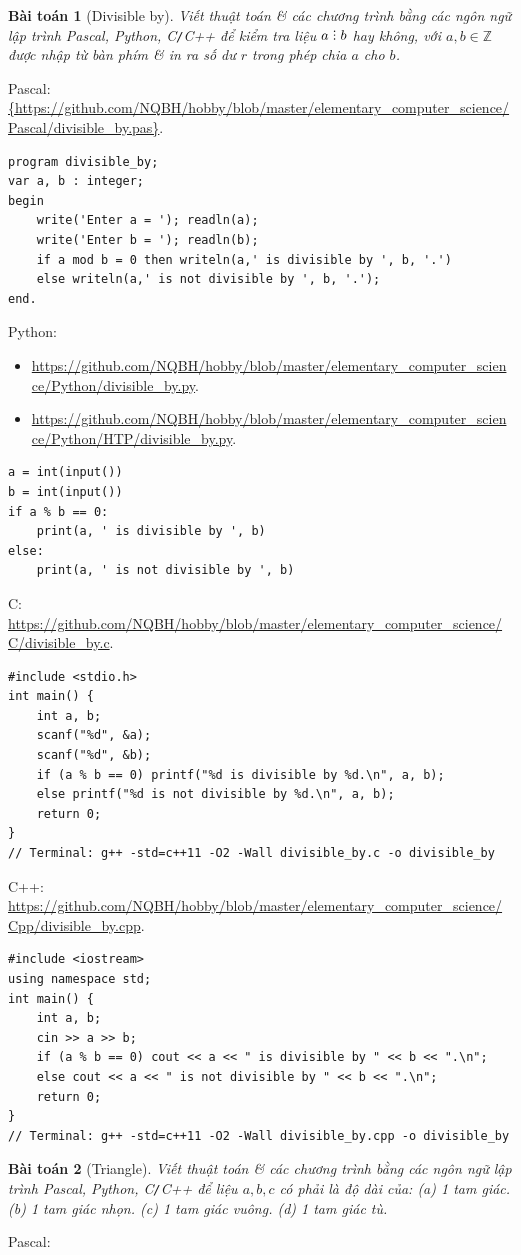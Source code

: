 \documentclass{article}
\newtheorem{baitoan}{Bài toán}
\DeclareRobustCommand{\divby}{%
	\mathrel{\vbox{\baselineskip.65ex\lineskiplimit0pt\hbox{.}\hbox{.}\hbox{.}}}%
}
\begin{document}
\begin{baitoan}[Divisible by]
	Viết thuật toán \& các chương trình bằng các ngôn ngữ lập trình {\sf Pascal, Python, C\texttt{/}C++} để kiểm tra liệu $a\divby b$ hay không, với $a,b\in\mathbb{Z}$ được nhập từ bàn phím \& in ra số dư $r$ trong phép chia $a$ cho $b$.
\end{baitoan}
\noindent Pascal: \url{{https://github.com/NQBH/hobby/blob/master/elementary_computer_science/Pascal/divisible_by.pas}}.
\begin{verbatim}
program divisible_by;
var a, b : integer;
begin
    write('Enter a = '); readln(a);
    write('Enter b = '); readln(b);
    if a mod b = 0 then writeln(a,' is divisible by ', b, '.')
    else writeln(a,' is not divisible by ', b, '.');
end.
\end{verbatim}
Python:
\begin{itemize}
	\item \url{https://github.com/NQBH/hobby/blob/master/elementary_computer_science/Python/divisible_by.py}.
	\item \url{https://github.com/NQBH/hobby/blob/master/elementary_computer_science/Python/HTP/divisible_by.py}.
\end{itemize} 
\begin{verbatim}
a = int(input())
b = int(input())
if a % b == 0:
    print(a, ' is divisible by ', b)
else:
    print(a, ' is not divisible by ', b)
\end{verbatim}
C: \url{https://github.com/NQBH/hobby/blob/master/elementary_computer_science/C/divisible_by.c}.
\begin{verbatim}
#include <stdio.h>
int main() {
    int a, b;
    scanf("%d", &a);
    scanf("%d", &b);
    if (a % b == 0) printf("%d is divisible by %d.\n", a, b);
    else printf("%d is not divisible by %d.\n", a, b);
    return 0;
}
// Terminal: g++ -std=c++11 -O2 -Wall divisible_by.c -o divisible_by
\end{verbatim}
C++: \url{https://github.com/NQBH/hobby/blob/master/elementary_computer_science/Cpp/divisible_by.cpp}.
\begin{verbatim}
#include <iostream>
using namespace std;
int main() {
    int a, b;
    cin >> a >> b;
    if (a % b == 0) cout << a << " is divisible by " << b << ".\n";
    else cout << a << " is not divisible by " << b << ".\n";
    return 0;
}
// Terminal: g++ -std=c++11 -O2 -Wall divisible_by.cpp -o divisible_by
\end{verbatim}

\begin{baitoan}[Triangle]
	Viết thuật toán \& các chương trình bằng các ngôn ngữ lập trình {\sf Pascal, Python, C\texttt{/}C++} để liệu $a,b,c$ có phải là độ dài của: (a) 1 tam giác. (b) 1 tam giác nhọn. (c) 1 tam giác vuông. (d) 1 tam giác tù.
\end{baitoan}
\noindent Pascal: 
\end{document}
